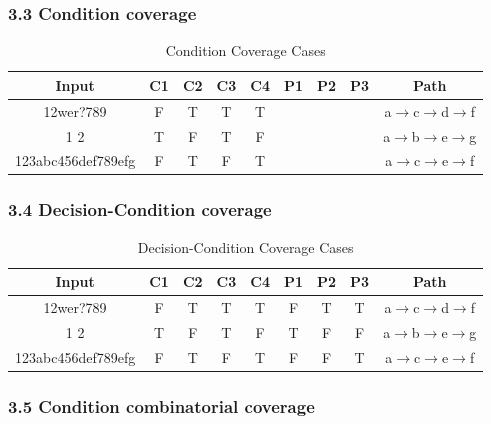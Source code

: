 \documentclass[11pt, oneside]{article}  %
\begin{document}
\subsubsection*{3.3 Condition coverage}

\begin{table}[H]
    \centering
    \begin{tabular}{|c|c|c|c|c|c|c|c|c|}
        \hline
        Input                & C1 & C2 & C3 & C4 & P1 & P2 & P3 & Path                                              \\ \hline
        12wer?789          & F  & T  & T  & T  &   &   &   & a$\rightarrow$c$\rightarrow$d$\rightarrow$f \\ \hline
        1 2                & T  & F  & T  & F  &   &   &   & a$\rightarrow$b$\rightarrow$e$\rightarrow$g \\ \hline
        123abc456def789efg & F  & T  & F  & T  &   &   &   & a$\rightarrow$c$\rightarrow$e$\rightarrow$f \\ \hline
    \end{tabular}
    \caption{Condition Coverage Cases}
\end{table}

\subsubsection*{3.4 Decision-Condition coverage}

\begin{table}[H]
    \centering
    \begin{tabular}{|c|c|c|c|c|c|c|c|c|}
    \hline
    Input                & C1 & C2 & C3 & C4 & P1 & P2 & P3 & Path                                              \\ \hline
    12wer?789          & F  & T  & T  & T  & F  & T  & T  & a$\rightarrow$c$\rightarrow$d$\rightarrow$f \\ \hline
    1 2                & T  & F  & T  & F  & T  & F  & F  & a$\rightarrow$b$\rightarrow$e$\rightarrow$g \\ \hline
    123abc456def789efg & F  & T  & F  & T  & F  & F  & T  & a$\rightarrow$c$\rightarrow$e$\rightarrow$f \\ \hline
    \end{tabular}
    \caption{Decision-Condition Coverage Cases}
\end{table}

\subsubsection*{3.5 Condition combinatorial coverage}
\end{document}
